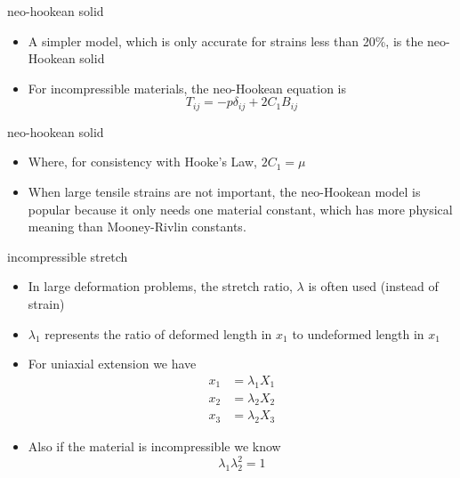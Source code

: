 \documentclass[
  letterpaper,
  ignorenonframetext,
  aspectratio=43,
  handout,
  12pt]{beamer}
\providecommand{\tightlist}{%
  \setlength{\itemsep}{0pt}\setlength{\parskip}{0pt}}
\providecommand{\tightlist}{%
\setlength{\itemsep}{0pt}\setlength{\parskip}{0pt}}
\begin{document}
\begin{frame}{neo-hookean solid}
\protect\hypertarget{neo-hookean-solid}{}
\begin{itemize}
\tightlist
\item
  A simpler model, which is only accurate for strains less than 20\%, is
  the neo-Hookean solid
\item
  For incompressible materials, the neo-Hookean equation is
  \[T_{ij} = -p \delta_{ij} + 2C_1 B_{ij}\]
\end{itemize}
\end{frame}

\begin{frame}{neo-hookean solid}
\protect\hypertarget{neo-hookean-solid-1}{}
\begin{itemize}
\tightlist
\item
  Where, for consistency with Hooke's Law, \(2 C_1 = \mu\)
\item
  When large tensile strains are not important, the neo-Hookean model is
  popular because it only needs one material constant, which has more
  physical meaning than Mooney-Rivlin constants.
\end{itemize}
\end{frame}

\begin{frame}{incompressible stretch}
\protect\hypertarget{incompressible-stretch}{}
\begin{itemize}
\item
  In large deformation problems, the stretch ratio, \(\lambda\) is often
  used (instead of strain)
\item
  \(\lambda_1\) represents the ratio of deformed length in \(x_1\) to
  undeformed length in \(x_1\)
\item
  For uniaxial extension we have \[\begin{aligned}
    x_1 &= \lambda_1 X_1\\
    x_2 &= \lambda_2 X_2\\
    x_3 &= \lambda_2 X_3
  \end{aligned}\]
\item
  Also if the material is incompressible we know
  \[\lambda_1 \lambda_2^2 = 1\]
\end{itemize}
\end{frame}
\end{document}

